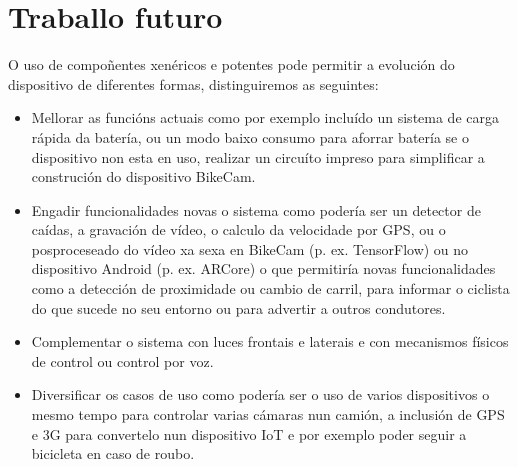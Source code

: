 \section{Traballo futuro}
O uso de compoñentes xenéricos e potentes pode permitir a evolución do dispositivo de diferentes formas, distinguiremos as seguintes:
\begin{itemize}
  \item Mellorar as funcións actuais como por exemplo incluído un sistema de carga rápida da batería, ou un modo baixo consumo para aforrar batería se o dispositivo non esta en uso, realizar un circuíto impreso para simplificar a construción do dispositivo BikeCam.
  \item Engadir funcionalidades novas o sistema como podería ser un detector de caídas, a gravación de vídeo, o calculo da velocidade por GPS, ou o posproceseado do vídeo xa sexa en BikeCam (p. ex. TensorFlow)  ou no dispositivo Android (p. ex. ARCore) o que permitiría novas funcionalidades como a detección de proximidade ou cambio de carril, para informar o ciclista do que sucede no seu entorno ou para advertir a outros condutores.
  \item Complementar o sistema con luces frontais e laterais e con mecanismos físicos de control ou control por voz.
  \item Diversificar os casos de uso como podería ser o uso de varios dispositivos o mesmo tempo para controlar varias cámaras nun camión, a inclusión de GPS e 3G para convertelo nun dispositivo IoT e por exemplo poder seguir a bicicleta en caso de roubo.
\end{itemize}
